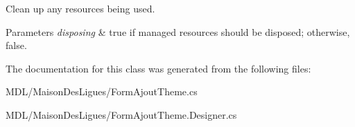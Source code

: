 Clean up any resources being used. 


\begin{DoxyParams}{Parameters}
{\em disposing} & true if managed resources should be disposed; otherwise, false.\\
\hline
\end{DoxyParams}


The documentation for this class was generated from the following files\+:\begin{DoxyCompactItemize}
\item 
M\+D\+L/\+Maison\+Des\+Ligues/Form\+Ajout\+Theme.\+cs\item 
M\+D\+L/\+Maison\+Des\+Ligues/Form\+Ajout\+Theme.\+Designer.\+cs\end{DoxyCompactItemize}
